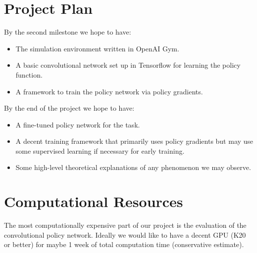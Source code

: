 \documentclass{article}
\begin{document}
\section{Project Plan}

By the second milestone we hope to have:
\begin{itemize}
    \item The simulation environment written in OpenAI Gym.
        \item A basic convolutional network set up in Tensorflow for learning the policy function.
            \item A framework to train the policy network via policy gradients.
            \end{itemize}

            By the end of the project we hope to have:
            \begin{itemize}
                \item A fine-tuned policy network for the task.
                    \item A decent training framework that primarily uses policy gradients but may use some supervised learning if necessary for early training.
                        \item Some high-level theoretical explanations of any phenomenon we may observe.
                        \end{itemize}

                        \section{Computational Resources}

                        The most computationally expensive part of our project is the evaluation of the convolutional policy network. Ideally we would like to have a decent GPU (K20 or better) for maybe 1 week of total computation time (conservative estimate).

                        
                        

                        
\end{document}
